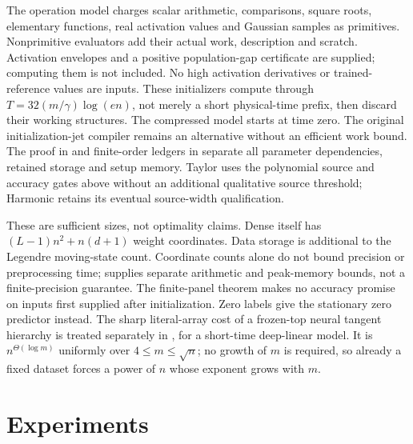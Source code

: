 \documentclass[11pt]{article}
\theoremstyle{definition}
\theoremstyle{remark}
\begin{document}
The operation model charges scalar arithmetic, comparisons, square roots,
elementary functions, real activation values and Gaussian samples as
primitives. Nonprimitive evaluators add their actual work, description and
scratch. Activation envelopes and a positive population-gap certificate are
supplied; computing them is not included. No high activation derivatives or
trained-reference values are inputs. These initializers compute through
$T=32(m/\gamma)\log(en)$, not merely a short physical-time prefix, then
discard their working structures. The compressed model starts at time zero.
The original initialization-jet compiler remains an alternative without an
efficient work bound. The proof in  and finite-order
ledgers in  separate all parameter dependencies,
retained storage and setup memory. Taylor uses the polynomial source and
accuracy gates above without an additional qualitative source threshold;
Harmonic retains its eventual source-width qualification.

These are sufficient sizes, not optimality claims. Dense itself has
$(L-1)n^2+n(d+1)$ weight coordinates. Data storage is additional to the
Legendre moving-state count. Coordinate counts alone do not bound precision
or preprocessing time;  supplies separate arithmetic
and peak-memory bounds, not a finite-precision guarantee.
The finite-panel theorem makes no accuracy promise on inputs first supplied
after initialization. Zero labels give the stationary zero predictor instead.
The sharp literal-array cost of a frozen-top neural tangent hierarchy is
treated separately in , for a short-time deep-linear
model. It is $n^{\Theta(\log m)}$ uniformly over $4\le m\le\sqrt n$; no
growth of $m$ is required, so already a fixed dataset forces a power of $n$
whose exponent grows with $m$.

\section{Experiments}
\label{cp:experiments}
\end{document}
